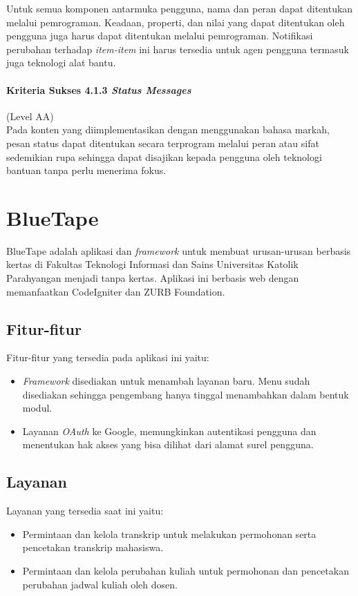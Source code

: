 Untuk semua komponen antarmuka pengguna, nama dan peran dapat ditentukan melalui pemrograman. Keadaan, properti, dan nilai yang dapat ditentukan oleh pengguna juga harus dapat ditentukan melalui pemrograman. Notifikasi perubahan terhadap \textit{item-item} ini harus tersedia untuk agen pengguna termasuk juga teknologi alat bantu.

\paragraph{Kriteria Sukses 4.1.3 \textit{Status Messages}}
\label{sec:kriteria_sukses_4.1.3}
(Level AA)\\

Pada konten yang diimplementasikan dengan menggunakan bahasa markah, pesan status dapat ditentukan secara terprogram melalui peran atau sifat sedemikian rupa sehingga dapat disajikan kepada pengguna oleh teknologi bantuan tanpa perlu menerima fokus.



\section{BlueTape}
\label{sec:bluetape}
BlueTape adalah aplikasi dan \textit{framework} untuk membuat urusan-urusan berbasis kertas di Fakultas Teknologi Informasi dan Sains Universitas Katolik Parahyangan menjadi tanpa kertas. Aplikasi ini berbasis web dengan memanfaatkan CodeIgniter dan ZURB Foundation.

\subsection{Fitur-fitur}
Fitur-fitur yang tersedia pada aplikasi ini yaitu:
\begin{itemize}
	\item \textit{Framework} disediakan untuk menambah layanan baru. Menu sudah disediakan sehingga pengembang hanya tinggal menambahkan dalam bentuk modul.
	\item Layanan \textit{OAuth} ke Google, memungkinkan autentikasi pengguna dan menentukan hak akses yang bisa dilihat dari alamat surel pengguna.
\end{itemize}

\subsection{Layanan}
Layanan yang tersedia saat ini yaitu:
\begin{itemize}
	\item Permintaan dan kelola transkrip untuk melakukan permohonan serta pencetakan transkrip mahasiswa.
	\item Permintaan dan kelola perubahan kuliah untuk permohonan dan pencetakan perubahan jadwal kuliah oleh dosen.
\end{itemize}

